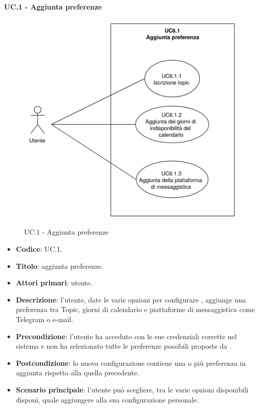 	\paragraph{UC\theuccount.1 - Aggiunta preferenze}
		\begin{figure}[H]
			\centering
			\includegraphics[width=\columnwidth]{img/UC6_1.png}\\
			\caption{UC\theuccount.1 - Aggiunta preferenze}
		\end{figure}
	\begin{itemize}
		\item \textbf{Codice}: UC\theuccount.1.
		\item \textbf{Titolo}: aggiunta preferenze.
		\item \textbf{Attori primari}: utente.
		\item \textbf{Descrizione}: l'utente, date le varie opzioni per configurare \progetto, aggiunge una preferenza tra Topic, giorni di calendario e piattaforme di messaggistica come Telegram o e-mail.
		\item \textbf{Precondizione}: l'utente ha acceduto con le sue credenziali corrette nel sistema e non ha selezionato tutte le preferenze possibili proposte da \progetto.
		\item \textbf{Postcondizione}: lo nuova configurazione contiene una o più preferenza in aggiunta rispetto alla quella precedente.
		\item \textbf{Scenario principale}: l'utente può scegliere, tra le varie opzioni disponibili disponi, quale aggiungere alla sua configurazione personale.
	\end{itemize}
	
